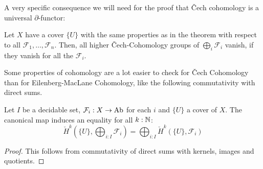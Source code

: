 A very specific consequence we will need for the proof that \v{C}ech cohomology is a universal $\partial$-functor:

\begin{corollary}%
  \label{chech-coefficient-sum}
  Let $X$ have a cover $\{U\}$ with the same properties as in the theorem with respect to all $\mathcal F_1,\dots,\mathcal F_n$.
  Then, all higher \v{C}ech-Cohomology groups of $\bigoplus_{i}\mathcal F_i$ vanish,
  if they vanish for all the $\mathcal F_i$.
\end{corollary}

Some properties of cohomology are a lot easier to check for \v{C}ech Cohomology than for Eilenberg-MacLane Cohomology,
like the following commutativity with direct sums.

\begin{lemma}
  \label{cech-commute-direct-sum}
  Let $I$ be a decidable set, $\mathcal F_i:X\to \operatorname{Ab}$ for each $i$ and $\{U\}$ a cover of $X$.
  The canonical map induces an equality for all $k:\mathbb{N}$:
  \[
    \check{H}^k(\{U\},\bigoplus_{i:I} \mathcal F_i)=\bigoplus_{i:I}\check{H}^k(\{U\},\mathcal F_i)
  \]
\end{lemma}

\begin{proof}
  This follows from commutativity of direct sums with kernels, images and quotients.
\end{proof}